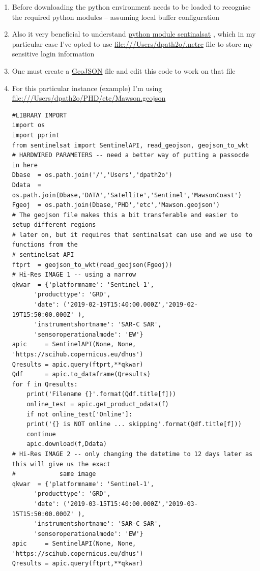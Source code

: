 \documentclass[11pt]{article}
\begin{document}
\begin{enumerate}
\item Before downloading the python environment needs to be loaded to recognise the required python
modules -- assuming local buffer configuration
\item Also it very beneficial to understand \href{https://sentinelsat.readthedocs.io/en/master/api\_overview.html}{python module sentinalsat} , which in my particular case
I've opted to use \url{file:///Users/dpath2o/.netrc} file to store my sensitive login information
\item One must create a \href{https://geojson.org}{GeoJSON} file and edit this code to work on that file
\item For this particular instance (example) I'm using \url{file:///Users/dpath2o/PHD/etc/Mawson.geojson}
\begin{verbatim}
#LIBRARY IMPORT
import os
import pprint
from sentinelsat import SentinelAPI, read_geojson, geojson_to_wkt
# HARDWIRED PARAMETERS -- need a better way of putting a passocde in here
Dbase  = os.path.join('/','Users','dpath2o')
Ddata  = os.path.join(Dbase,'DATA','Satellite','Sentinel','MawsonCoast')
Fgeoj  = os.path.join(Dbase,'PHD','etc','Mawson.geojson')
# The geojson file makes this a bit transferable and easier to setup different regions
# later on, but it requires that sentinalsat can use and we use to functions from the
# sentinelsat API
ftprt  = geojson_to_wkt(read_geojson(Fgeoj))
# Hi-Res IMAGE 1 -- using a narrow 
qkwar  = {'platformname': 'Sentinel-1',
	  'producttype': 'GRD',
	  'date': ('2019-02-19T15:40:00.000Z','2019-02-19T15:50:00.000Z' ),
	  'instrumentshortname': 'SAR-C SAR',
	  'sensoroperationalmode': 'EW'}
apic     = SentinelAPI(None, None, 'https://scihub.copernicus.eu/dhus')
Qresults = apic.query(ftprt,**qkwar)
Qdf      = apic.to_dataframe(Qresults)
for f in Qresults:
    print('Filename {}'.format(Qdf.title[f]))
    online_test = apic.get_product_odata(f)
    if not online_test['Online']:
	print('{} is NOT online ... skipping'.format(Qdf.title[f]))
	continue
    apic.download(f,Ddata)
# Hi-Res IMAGE 2 -- only changing the datetime to 12 days later as this will give us the exact
#            same image
qkwar  = {'platformname': 'Sentinel-1',
	  'producttype': 'GRD',
	  'date': ('2019-03-15T15:40:00.000Z','2019-03-15T15:50:00.000Z' ),
	  'instrumentshortname': 'SAR-C SAR',
	  'sensoroperationalmode': 'EW'}
apic     = SentinelAPI(None, None, 'https://scihub.copernicus.eu/dhus')
Qresults = apic.query(ftprt,**qkwar)

\end{verbatim}
\end{enumerate}
\end{document}
